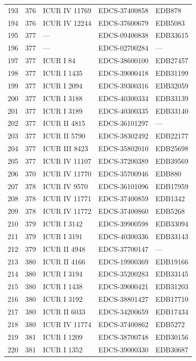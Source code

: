 \begin{longtable}{@{}r r l l l@{}}
193 & 376 & ICUR IV 11769 & EDCS-37400858 & EDB878 \\
194 & 376 & ICUR IV 12244 & EDCS-37600679 & EDB5083 \\
195 & 377 & — & EDCS-09400838 & EDB33615 \\
196 & 377 & — & EDCS-02700284 & — \\
197 & 377 & ICUR I 84 & EDCS-38600100 & EDB27457 \\
198 & 377 & ICUR I 1435 & EDCS-39000418 & EDB31199 \\
199 & 377 & ICUR I 2094 & EDCS-39300316 & EDB32059 \\
200 & 377 & ICUR I 3188 & EDCS-40300334 & EDB33139 \\
201 & 377 & ICUR I 3189 & EDCS-40300335 & EDB33140 \\
202 & 377 & ICUR II 4815 & EDCS-36101297 & — \\
203 & 377 & ICUR II 5790 & EDCS-38302492 & EDB22177 \\
204 & 377 & ICUR III 8423 & EDCS-35802010 & EDB25698 \\
205 & 377 & ICUR IV 11107 & EDCS-37200389 & EDB39569 \\
206 & 370 & ICUR IV 11770 & EDCS-35700946 & EDB880 \\
207 & 378 & ICUR IV 9570 & EDCS-36101096 & EDB17959 \\
208 & 378 & ICUR IV 11771 & EDCS-37400859 & EDB1342 \\
209 & 378 & ICUR IV 11772 & EDCS-37400860 & EDB5268 \\
210 & 379 & ICUR I 3142 & EDCS-39900598 & EDB33094 \\
211 & 379 & ICUR I 3191 & EDCS-40300336 & EDB33143 \\
212 & 379 & ICUR II 4948 & EDCS-37700147 & — \\
213 & 380 & ICUR II 4166 & EDCS-19900369 & EDB19166 \\
214 & 380 & ICUR I 3194 & EDCS-35200283 & EDB33145 \\
215 & 380 & ICUR I 1438 & EDCS-39000421 & EDB31203 \\
216 & 380 & ICUR I 3192 & EDCS-38801427 & EDB17710 \\
217 & 380 & ICUR II 6033 & EDCS-34200659 & EDB17434 \\
218 & 380 & ICUR IV 11774 & EDCS-37400862 & EDB5272 \\
219 & 381 & ICUR I 1209 & EDCS-38700748 & EDB30156 \\
220 & 381 & ICUR I 1352 & EDCS-39000330 & EDB30687 \\

\end{longtable}

